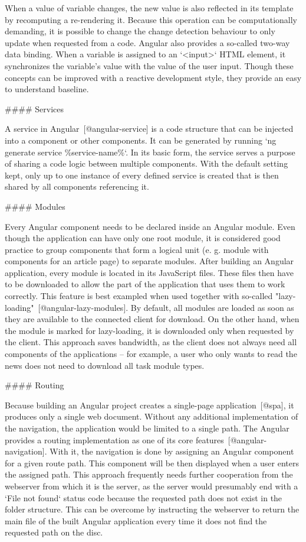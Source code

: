 \documentclass[
  digital, %
  oneside, %
  lof,     %
  nolot,     %
]{fithesis4}
\begin{document}
When a value of variable changes, the new value is also reflected in its template by recomputing a re-rendering it. Because this operation can be computationally demanding, it is possible to change the change detection behaviour to only update when requested from a code. Angular also provides a so-called two-way data binding. When a variable is assigned to an `<input>` HTML element, it synchronizes the variable's value with the value of the user input. Though these concepts can be improved with a reactive development style, they provide an easy to understand baseline.

#### Services

A service in Angular~[@angular-service] is a code structure that can be injected into a component or other components. It can be generated by running `ng generate service \%service-name\%`. In its basic form, the service serves a purpose of sharing a code logic between multiple components. With the default setting kept, only up to one instance of every defined service is created that is then shared by all components referencing it.

#### Modules

Every Angular component needs to be declared inside an Angular module. Even though the application can have only one root module, it is considered good practice to group components that form a logical unit (e. g. module with components for an article page) to separate modules. After building an Angular application, every module is located in its JavaScript files. These files then have to be downloaded to allow the part of the application that uses them to work correctly. This feature is best exampled when used together with so-called "lazy-loading"~[@angular-lazy-modules]. By default, all modules are loaded as soon as they are available to the connected client for download. On the other hand, when the module is marked for lazy-loading, it is downloaded only when requested by the client. This approach saves bandwidth, as the client does not always need all components of the applications -- for example, a user who only wants to read the news does not need to download all task module types.

#### Routing

Because building an Angular project creates a single-page application~[@spa], it produces only a single web document. Without any additional implementation of the navigation, the application would be limited to a single path. The Angular provides a routing implementation as one of its core features~[@angular-navigation]. With it, the navigation is done by assigning an Angular component for a given route path. This component will be then displayed when a user enters the assigned path. This approach frequently needs further cooperation from the webserver from which it is the server, as the server would presumably end with a `File not found` status code because the requested path does not exist in the folder structure. This can be overcome by instructing the webserver to return the main file of the built Angular application every time it does not find the requested path on the disc.
\end{document}
